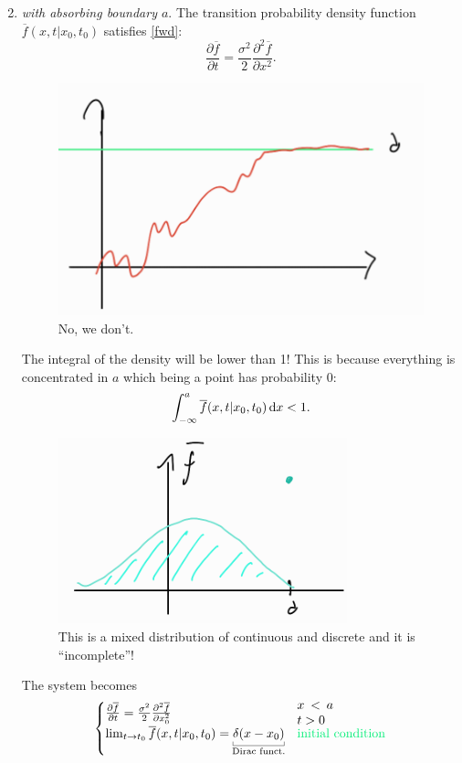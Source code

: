 \documentclass[12pt]{report}
\begin{document}
\begin{enumerate}
\begin{equation*}
	\end{equation*}
	\item \textit{\bwm{} with absorbing boundary $a$}. The transition probability density function $\overline{f}(x,t|x_{0},t_{0})$ satisfies \ref{fwd}:
	\begin{equation*}
		\frac{\partial\overline{f}}{\partial t}=\frac{\sigma^{2}}{2}\frac{\partial^{2}\overline{f}}{\partial x^{2}}.
	\end{equation*}
	\begin{figure}[H]
		\centering
		\includegraphics[width=0.5\linewidth]{img/screenshot053}
		\caption{No, we don't.}
		\label{fig:screenshot053}
	\end{figure}
	The integral of the density will be lower than 1! This is because everything is concentrated in $a$ which being a point has probability 0:
	\begin{equation*}
		\int_{-\infty}^{a}\overline{f}(x,t|x_{0},t_{0})\mathop{}\!\mathrm{d} x<1.
	\end{equation*}
	\begin{figure}[h]
		\centering
		\includegraphics[width=0.5\linewidth]{img/screenshot054}
		\caption{This is a mixed distribution of continuous and discrete and it is ``incomplete''!}
		\label{fig:screenshot054}
	\end{figure}
	The system becomes
		\begin{equation*}\begin{cases}
			\frac{\partial\overline{f}}{\partial t}=\frac{\sigma^{2}}{2}\frac{\partial^{2}\overline{f}}{\partial x_{0}^{2}}&\parbox{1cm}{$x<a$ $t>0$}\\
			\lim_{t\to t_0}\overline{f}(x,t|x_{0},t_{0})=\ubracketthin{\delta(x-x_{0})}_{\claptext{Dirac funct.}}&\text{\textcolor{SpringGreen2}{initial condition}}\\

\end{cases}
\end{equation*}
\end{enumerate}
\end{document}
